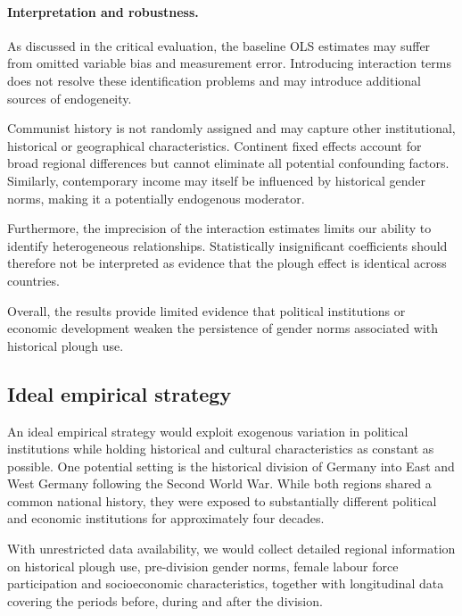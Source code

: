 \documentclass[12pt,a4paper]{article}
\begin{document}
\paragraph{Interpretation and robustness.}

As discussed in the critical evaluation, the baseline OLS estimates may suffer from omitted variable bias and measurement error. Introducing interaction terms does not resolve these identification problems and may introduce additional sources of endogeneity.

Communist history is not randomly assigned and may capture other institutional, historical or geographical characteristics. Continent fixed effects account for broad regional differences but cannot eliminate all potential confounding factors. Similarly, contemporary income may itself be influenced by historical gender norms, making it a potentially endogenous moderator.

Furthermore, the imprecision of the interaction estimates limits our ability to identify heterogeneous relationships. Statistically insignificant coefficients should therefore not be interpreted as evidence that the plough effect is identical across countries.

Overall, the results provide limited evidence that political institutions or economic development weaken the persistence of gender norms associated with historical plough use.

\subsection{Ideal empirical strategy}

An ideal empirical strategy would exploit exogenous variation in political institutions while holding historical and cultural characteristics as constant as possible. One potential setting is the historical division of Germany into East and West Germany following the Second World War. While both regions shared a common national history, they were exposed to substantially different political and economic institutions for approximately four decades.

With unrestricted data availability, we would collect detailed regional information on historical plough use, pre-division gender norms, female labour force participation and socioeconomic characteristics, together with longitudinal data covering the periods before, during and after the division.
\end{document}
